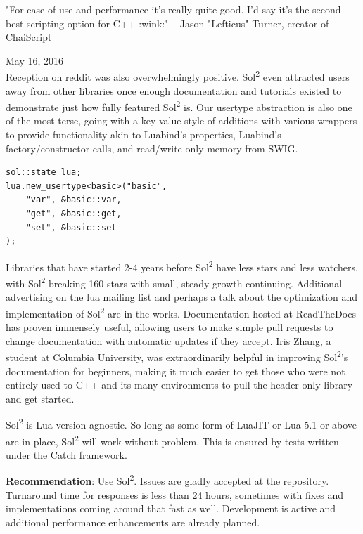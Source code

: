 \documentclass[conference,compsoc]{IEEEtran}
\newcommand{\soltwo}{Sol\textsuperscript{2}}
\begin{document}
\hfill "For ease of use and performance it's really quite good. I'd say it's the second best scripting option for C++ :wink:" -- Jason "Lefticus" Turner, creator of ChaiScript

\hfill May 16, 2016 \\

Reception on reddit was also overwhelmingly positive\cite{sol2-reddit}. \soltwo{} even attracted users away from other libraries once enough documentation and tutorials existed to demonstrate just how fully featured \href{https://github.com/ThePhD/sol2/issues/36\#issuecomment-199290974}{\soltwo{} is}. Our usertype abstraction is also one of the most terse, going with a key-value style of additions with various wrappers to provide functionality akin to Luabind's properties, Luabind's factory/constructor calls, and read/write only memory from SWIG.

\begin{lstlisting}[caption={\soltwo{} usertype example, performing the same binding for the \lstinline|basic| class as shown with many of the other libraries. Noticeably more terse.}, label={lst:sol-usertype}]
sol::state lua;
lua.new_usertype<basic>("basic",
	"var", &basic::var,
	"get", &basic::get,
	"set", &basic::set
);
\end{lstlisting}

Libraries that have started 2-4 years before \soltwo{} have less stars and less watchers, with \soltwo{} breaking 160 stars with small, steady growth continuing. Additional advertising on the lua mailing list and perhaps a talk about the optimization and implementation of \soltwo{} are in the works. Documentation hosted at ReadTheDocs\cite{readthedocs} has proven immensely useful, allowing users to make simple pull requests to change documentation with automatic updates if they accept. Iris Zhang, a student at Columbia University, was extraordinarily helpful in improving \soltwo{}'s documentation for beginners, making it much easier to get those who were not entirely used to C++ and its many environments to pull the header-only library and get started.

\soltwo{} is Lua-version-agnostic. So long as some form of LuaJIT or Lua 5.1 or above are in place, \soltwo{} will work without problem. This is ensured by tests written under the Catch\cite{catch} framework.

\textbf{Recommendation}: Use \soltwo{}. Issues are gladly accepted at the repository. Turnaround time for responses is less than 24 hours, sometimes with fixes and implementations coming around that fast as well. Development is active and additional performance enhancements are already planned.
\end{document}
